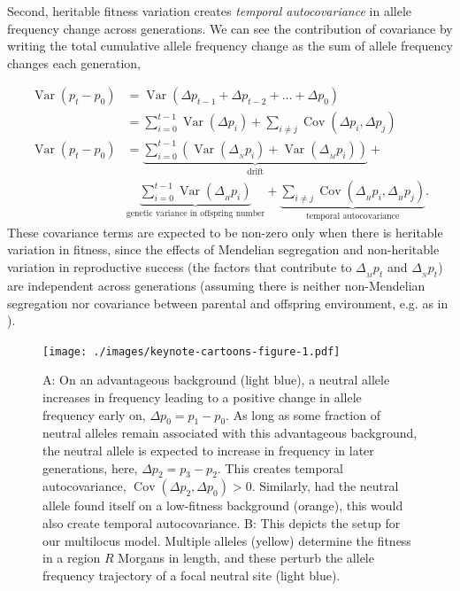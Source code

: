 \documentclass[11pt]{article}
\newcommand{\nnn}{\nonumber}
\DeclareMathOperator{\var}{Var}
\DeclareMathOperator{\cov}{Cov}
\begin{document}
Second, heritable fitness variation creates \emph{temporal autocovariance} in
allele frequency change across generations. We can see the contribution of
covariance by writing the total cumulative allele frequency change as the sum
of allele frequency changes each generation,

\begin{align}
  \label{eq:var-decomp}
  \var(p_t - p_0) &= \var(\Delta p_{t-1} + \Delta p_{t-2} + \ldots + \Delta p_0) \nnn \\
                  &= \sum_{i=0}^{t-1} \var(\Delta p_i) + \sum_{i \ne j} \cov(\Delta p_{i}, \Delta p_{j}) \nnn \\
  \var(p_t - p_0) &= \underbrace{\sum_{i=0}^{t-1} \left(\var(\Delta_{_N} p_i) +  \var(\Delta_{_M} p_i) \right)}_\text{drift} +  \nonumber\\ 
                  &\underbrace{\sum_{i=0}^{t-1} \var(\Delta_{_H} p_i)}_\text{genetic variance in offspring number} + \underbrace{\sum_{i \ne j} \cov(\Delta_{_H} p_i, \Delta_{_H} p_j)}_\text{temporal autocovariance}.
\end{align}
%
These covariance terms are expected to be non-zero only when there is heritable
variation in fitness, since the effects of Mendelian segregation and
non-heritable variation in reproductive success (the factors that contribute to
$\Delta_{_M} p_t$ and $\Delta_{_N} p_t$) are independent across generations
(assuming there is neither non-Mendelian segregation nor covariance between
parental and offspring environment, e.g. as in \cite{Heyer2005-cl}). 


\begin{figure}[!ht]
  \centering
  \texttt{[image: ./images/keynote-cartoons-figure-1.pdf]}

  \caption{A: On an advantageous background (light blue), a neutral allele
    increases in frequency leading to a positive change in allele frequency
    early on, $\Delta p_0 = p_1 - p_0$. As long as some fraction of neutral
    alleles remain associated with this advantageous background, the neutral
    allele is expected to increase in frequency in later generations, here,
    $\Delta p_2 = p_3 - p_2$. This creates temporal autocovariance,
    $\cov(\Delta p_2, \Delta p_0) > 0$. Similarly, had the neutral allele found
    itself on a low-fitness background (orange), this would also create temporal
    autocovariance.  B: This depicts the setup for our multilocus model.
    Multiple alleles (yellow) determine the fitness in a region $R$ 
    Morgans in length, and these perturb the allele frequency trajectory 
    of a focal neutral site (light blue). 
  }
  \label{fig:cartoon}
\end{figure}
\end{document}
